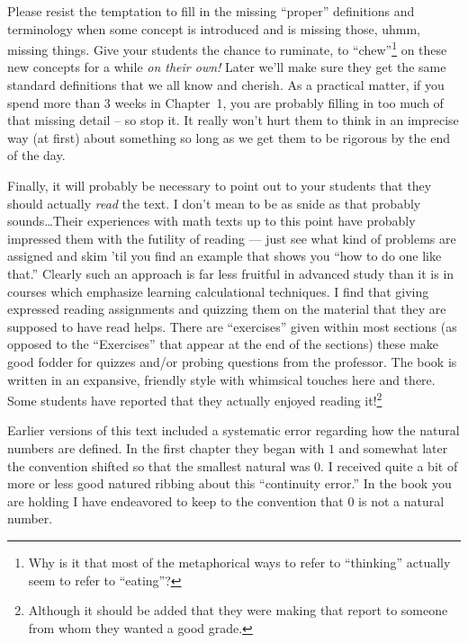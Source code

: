 Please resist the temptation to fill in the missing ``proper'' 
definitions and terminology when some concept is introduced and
is missing those, uhmm, missing things.  Give your students the
chance to ruminate, to ``chew''\footnote{Why is it that most %
of the metaphorical ways to refer to ``thinking'' actually seem %
to refer to ``eating''?} on these new concepts for a while
{\em on their own!}  Later we'll make sure they get the same 
standard definitions that we all know and cherish.  As a practical
matter, if you spend more than 3 weeks in Chapter~1, you are 
probably filling in too much of that missing detail -- so stop it.
It really won't hurt them to think in an imprecise way (at first)
about something so long as we get them to be rigorous by the 
end of the day.   

Finally, it will probably be necessary to point out to your
students that they should actually {\em read} the text.  I
don't mean to be as snide as that probably sounds\ldots  Their
experiences with math texts up to this point have probably impressed
them with the futility of reading --- just see what kind of problems
are assigned and skim 'til you find an example that shows you ``how
to do one like that.''  Clearly such an approach is far less fruitful
in advanced study than it is in courses which emphasize learning
calculational techniques.  I find that giving expressed reading 
assignments and quizzing them on the material that they are supposed
to have read helps.  There are ``exercises'' given within most 
sections (as opposed to the ``Exercises'' that appear at the end
of the sections) these make good fodder for quizzes and/or probing 
questions from the professor.  The book is written in an expansive,
friendly style with whimsical touches here and there.  Some students
have reported that they actually enjoyed reading it!\footnote{Although %
it should be added that they were making that report to someone %
from whom they wanted a good grade.}
  
Earlier versions of this text included a systematic error regarding how
the natural numbers are defined.  In the first chapter they began with $1$
and somewhat later the convention shifted so that the smallest natural 
was $0$.  I received quite a bit of more or less good natured ribbing 
about this ``continuity error.''  
%
{In the book you are holding I have endeavored to keep to the convention that $0$ is not a 
natural number.}

 

